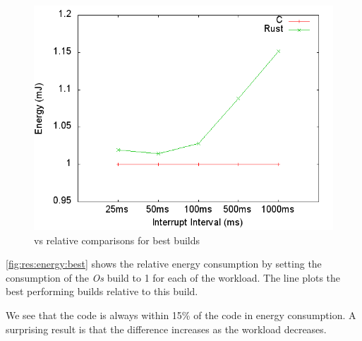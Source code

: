 \begin{figure}[H]
  \includegraphics[width=\textwidth]{results/plots/energy/best.png}
  \caption{{\rust} vs {\C} relative comparisons for best builds}
  \label{fig:res:energy:best}
\end{figure}

\autoref{fig:res:energy:best} shows the relative energy consumption by setting the consumption of the {\C} \emph{Os} build to 1 for each of the workload.
The {\rust} line plots the best performing {\rust} builds relative to this {\C} build.

We see that the {\rust} code is always within 15\% of the {\C} code in energy consumption.
A surprising result is that the difference increases as the workload decreases.
